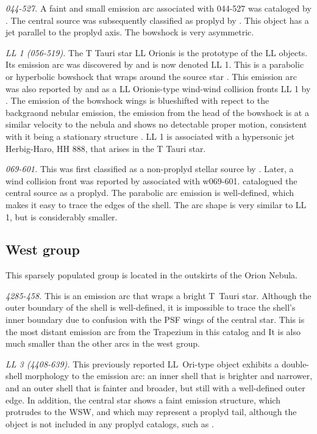 \documentclass[iop, apj]{emulateapj}
\renewcommand\clearpage{}
\begin{document}
\textit{044-527.} A faint and small emission arc associated with 044-527 was cataloged by \citet{Bally:2000a}. The central source was subsequently classified as proplyd by \citet{Ricci:2008a}. This object has a jet parallel to the proplyd axis. The bowshock is very asymmetric.

\textit{LL 1 (056-519).} The T Tauri star LL Orionis is the prototype
of the LL objects. Its emission arc was discovered by
\citet{Gull:1979a} and is now denoted LL 1. This is a parabolic or
hyperbolic bowshock that wraps around the source star
\citep{Bally:2006a}. This emission arc was also reported by
\citet{Bally:2000a} and as a LL Orionis-type wind-wind collision
fronts LL 1 by \citet{Bally:2001a}. The emission of the bowshock wings
is blueshifted with repect to the backgraond nebular emission, the
emission from the head of the bowshock is at a similar velocity to the
nebula and shows no detectable proper motion, consistent with it being
a stationary structure \citep{Henney:2013a}. LL 1 is associated with a
hypersonic jet Herbig-Haro, HH 888, that arises in the T Tauri star.
    

\textit{069-601.} This was first classified as a non-proplyd stellar source by \citet{ODell:1996a}. Later, a wind collision front was reported  by \citet{Bally:2000a} associated with w069-601. \citet{Ricci:2008a} catalogued the central source as a proplyd. The parabolic arc emission is well-defined, which makes it easy to trace the edges of the shell. The arc shape is very similar to LL 1, but is considerably smaller. 

\clearpage
\subsection{West group}
\label{sec:w-group}



This sparsely populated group is located in the outskirts of the Orion Nebula. 

\textit{4285-458.} This is an emission arc that wraps a bright T~Tauri
star. Although the outer boundary of the shell is well-defined, it is
impossible to trace the shell's inner boundary due to confusion with
the PSF wings of the central star. This is the most distant emission
arc from the Trapezium in this catalog and It is also much smaller
than the other arcs in the west group.

\textit{LL 3 (4408-639).} This previously reported LL~Ori-type object
\citep{Bally:2001a} exhibits a double-shell morphology to the emission
arc: an inner shell that is brighter and narrower, and an outer shell
that is fainter and broader, but still with a well-defined outer edge.
In addition, the central star shows a faint emission structure, which
protrudes to the WSW, and which may represent a proplyd tail, although
the object is not included in any proplyd catalogs, such as
\citet{Ricci:2008a}.
\end{document}
